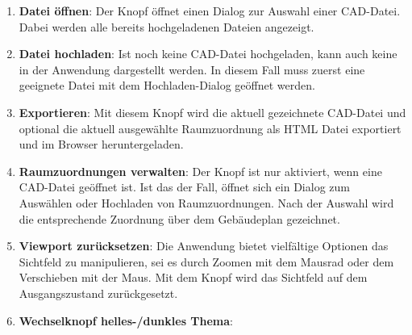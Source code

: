 \begin{enumerate}
    \item \textbf{Datei öffnen}: Der Knopf öffnet einen Dialog zur Auswahl einer CAD-Datei.
    Dabei werden alle bereits hochgeladenen Dateien angezeigt.
    \item \textbf{Datei hochladen}: Ist noch keine CAD-Datei hochgeladen, kann auch keine in der Anwendung dargestellt werden.
    In diesem Fall muss zuerst eine geeignete Datei mit dem Hochladen-Dialog geöffnet werden.
    \item \textbf{Exportieren}: Mit diesem Knopf wird die aktuell gezeichnete CAD-Datei und optional die aktuell ausgewählte Raumzuordnung als HTML Datei exportiert und im Browser heruntergeladen.
    \item \textbf{Raumzuordnungen verwalten}: Der Knopf ist nur aktiviert, wenn eine CAD-Datei geöffnet ist.
    Ist das der Fall, öffnet sich ein Dialog zum Auswählen oder Hochladen von Raumzuordnungen.
    Nach der Auswahl wird die entsprechende Zuordnung über dem Gebäudeplan gezeichnet.
    \item \textbf{Viewport zurücksetzen}: Die Anwendung bietet vielfältige Optionen das Sichtfeld zu manipulieren, sei es durch Zoomen mit dem Mausrad oder dem Verschieben mit der Maus.
    Mit dem Knopf wird das Sichtfeld auf dem Ausgangszustand zurückgesetzt.
    \item \textbf{Wechselknopf helles-/dunkles Thema}: 
\end{enumerate}


